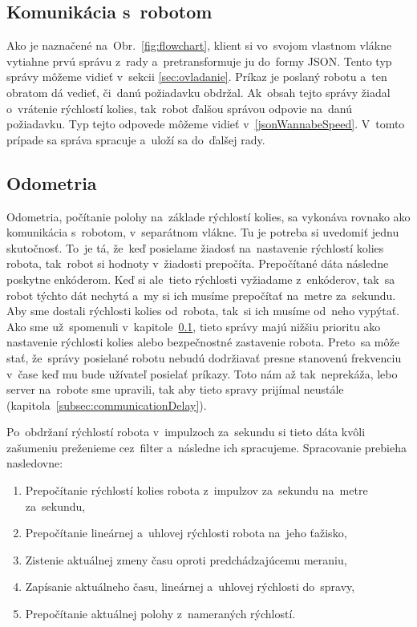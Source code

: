 \subsection{Komunikácia s~robotom}
\label{sec:robotComms}

Ako je naznačené na~Obr.~\ref{fig:flowchart}, klient si vo~svojom vlastnom vlákne vytiahne
prvú správu z~rady a~pretransformuje ju do~formy JSON. Tento typ správy môžeme vidieť v~sekcii
\ref{sec:ovladanie}. Príkaz je poslaný robotu a~ten obratom dá vedieť, či~danú požiadavku obdržal.
Ak~obsah tejto správy žiadal o~vrátenie rýchlostí kolies, tak~robot ďalšou správou odpovie
na~danú požiadavku. Typ tejto odpovede môžeme vidieť v~\ref{jsonWannabeSpeed}. V~tomto prípade
sa správa spracuje a~uloží sa do~ďalšej rady.

\subsection{Odometria}
\label{sec:odometria}

Odometria, počítanie polohy na~základe rýchlostí kolies, sa vykonáva rovnako ako komunikácia
s~robotom, v~separátnom vlákne. Tu je potreba si uvedomiť jednu skutočnosť. To~je tá, že~keď
posielame žiadosť na~nastavenie rýchlostí kolies robota, tak~robot si hodnoty v~žiadosti prepočíta.
Prepočítané dáta následne poskytne enkóderom. Keď si ale~tieto rýchlosti vyžiadame z~enkóderov,
tak~sa robot týchto dát nechytá a~my si ich musíme prepočítať na~metre za~sekundu. Aby sme dostali
rýchlosti kolies od~robota, tak~si ich musíme od~neho vypýtať. Ako sme už~spomenuli v~kapitole~\ref{sec:robotComms},
tieto správy majú nižšiu prioritu ako nastavenie rýchlosti kolies alebo bezpečnostné zastavenie
robota. Preto~sa môže stať, že~správy posielané robotu nebudú dodržiavať presne stanovenú frekvenciu
v~čase keď mu bude užívateľ posielať príkazy. Toto nám až tak~neprekáža, lebo server na~robote sme upravili, tak aby tieto
spravy prijímal neustále (kapitola~\ref{subsec:communicationDelay}).

Po~obdržaní rýchlostí robota v~impulzoch za~sekundu si tieto dáta kvôli zašumeniu preženieme cez~filter
a~následne ich spracujeme. Spracovanie prebieha nasledovne:

\begin{enumerate}
	\item Prepočítanie rýchlostí kolies robota z~impulzov za~sekundu na~metre za~sekundu,
	\item Prepočítanie lineárnej a~uhlovej rýchlosti robota na~jeho ťažisko,
	\item Zistenie aktuálnej zmeny času oproti predchádzajúcemu meraniu,
	\item Zapísanie aktuálneho času, lineárnej a~uhlovej rýchlosti do~spravy,
	\item Prepočítanie aktuálnej polohy z~nameraných rýchlostí.
\end{enumerate}

